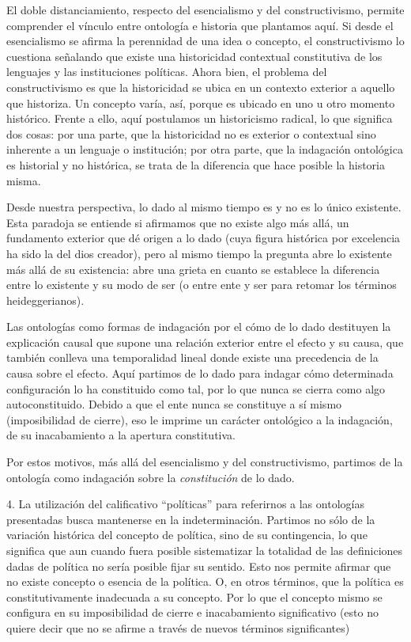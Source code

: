 \documentclass{book}
\begin{document}
El doble distanciamiento, respecto del esencialismo y del
constructivismo, permite comprender el vínculo entre ontología e
historia que plantamos aquí. Si desde el esencialismo se afirma la
perennidad de una idea o concepto, el constructivismo lo cuestiona
señalando que existe una historicidad contextual constitutiva de los
lenguajes y las instituciones políticas. Ahora bien, el problema del
constructivismo es que la historicidad se ubica en un contexto exterior
a aquello que historiza. Un concepto varía, así, porque es ubicado en
uno u otro momento histórico. Frente a ello, aquí postulamos un
historicismo radical, lo que significa dos cosas: por una parte, que la
historicidad no es exterior o contextual sino inherente a un lenguaje o
institución; por otra parte, que la indagación ontológica es historial y
no histórica, se trata de la diferencia que hace posible la historia
misma.

Desde nuestra perspectiva, lo dado al mismo tiempo es y no es lo único
existente. Esta paradoja se entiende si afirmamos que no existe algo más
allá, un fundamento exterior que dé origen a lo dado (cuya figura
histórica por excelencia ha sido la del dios creador), pero al mismo
tiempo la pregunta abre lo existente más allá de su existencia: abre una
grieta en cuanto se establece la diferencia entre lo existente y su modo
de ser (o entre ente y ser para retomar los términos heideggerianos).

Las ontologías como formas de indagación por el cómo de lo dado
destituyen la explicación causal que supone una relación exterior entre
el efecto y su causa, que también conlleva una temporalidad lineal donde
existe una precedencia de la causa sobre el efecto. Aquí partimos de lo
dado para indagar cómo determinada configuración lo ha constituido como
tal, por lo que nunca se cierra como algo autoconstituido. Debido a que
el ente nunca se constituye a sí mismo (imposibilidad de cierre), eso le
imprime un carácter ontológico a la indagación, de su inacabamiento a la
apertura constitutiva.

Por estos motivos, más allá del esencialismo y del constructivismo,
partimos de la ontología como indagación sobre la \emph{constitución} de
lo dado.

4. La utilización del calificativo \enquote{políticas} para referirnos a las
ontologías presentadas busca mantenerse en la indeterminación. Partimos
no sólo de la variación histórica del concepto de política, sino de su
contingencia, lo que significa que aun cuando fuera posible sistematizar
la totalidad de las definiciones dadas de política no sería posible
fijar su sentido. Esto nos permite afirmar que no existe concepto o
esencia de la política. O, en otros términos, que la política es
constitutivamente inadecuada a su concepto. Por lo que el concepto mismo
se configura en su imposibilidad de cierre e inacabamiento significativo
(esto no quiere decir que no se afirme a través de nuevos términos
significantes)
\end{document}
